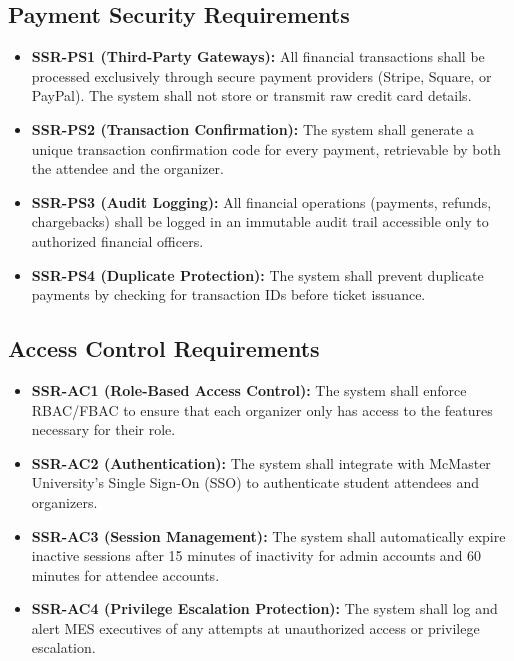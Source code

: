 \documentclass{article}
\begin{document}
\subsection{Payment Security Requirements}
\begin{itemize}
    \item \textbf{SSR-PS1 (Third-Party Gateways):} All financial transactions shall be processed exclusively through secure payment providers (Stripe, Square, or PayPal). The system shall not store or transmit raw credit card details.
    \item \textbf{SSR-PS2 (Transaction Confirmation):} The system shall generate a unique transaction confirmation code for every payment, retrievable by both the attendee and the organizer.
    \item \textbf{SSR-PS3 (Audit Logging):} All financial operations (payments, refunds, chargebacks) shall be logged in an immutable audit trail accessible only to authorized financial officers.
    \item \textbf{SSR-PS4 (Duplicate Protection):} The system shall prevent duplicate payments by checking for transaction IDs before ticket issuance.
\end{itemize}

\subsection{Access Control Requirements}
\begin{itemize}
    \item \textbf{SSR-AC1 (Role-Based Access Control):} The system shall enforce RBAC/FBAC to ensure that each organizer only has access to the features necessary for their role.
    \item \textbf{SSR-AC2 (Authentication):} The system shall integrate with McMaster University's Single Sign-On (SSO) to authenticate student attendees and organizers.
    \item \textbf{SSR-AC3 (Session Management):} The system shall automatically expire inactive sessions after 15 minutes of inactivity for admin accounts and 60 minutes for attendee accounts.
    \item \textbf{SSR-AC4 (Privilege Escalation Protection):} The system shall log and alert MES executives of any attempts at unauthorized access or privilege escalation.
\end{itemize}
\end{document}
